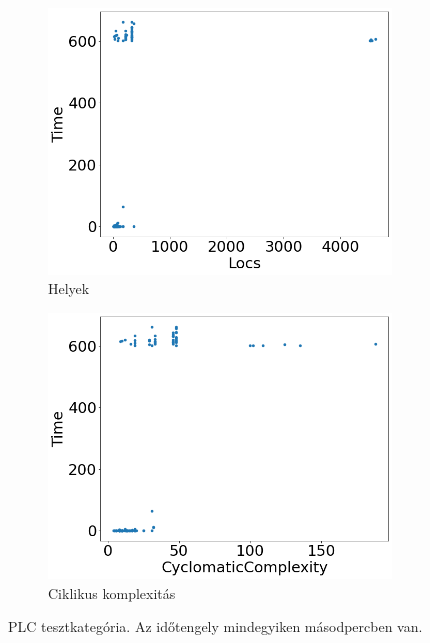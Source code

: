 \begin{figure}[ht]
\begin{subfigure}[b]{0.5\linewidth}
		\includegraphics[width=0.95\linewidth]{figures/plc/locs.png} 
		\caption{Helyek} 
		\label{fig7:c} 
	\end{subfigure}%
	\begin{subfigure}[b]{0.5\linewidth}
		\centering
		\includegraphics[width=0.95\linewidth]{figures/plc/cc.png} 
		\caption{Ciklikus komplexitás} 
		\label{fig7:d} 
	\end{subfigure} 
	\caption{PLC tesztkategória. Az időtengely mindegyiken másodpercben van.}
	\label{fig_plc} 
\end{figure}

